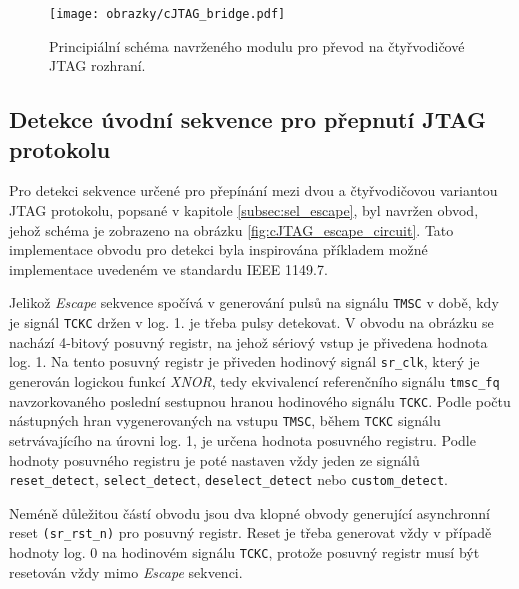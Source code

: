 \begin{figure}[!h]
  \begin{center}
    \texttt{[image: obrazky/cJTAG\_bridge.pdf]}
  \end{center}
  \caption{Principiální schéma navrženého modulu pro převod na čtyřvodičové \acs{JTAG} rozhraní.}
	\label{fig:cJTAG_bridge}
\end{figure}

\subsection{Detekce úvodní sekvence pro přepnutí \acs{JTAG} protokolu}	\label{subsec:sel_escape_det}
Pro detekci sekvence určené pro přepínání mezi dvou a čtyřvodičovou variantou \acs{JTAG} protokolu, popsané v kapitole \ref{subsec:sel_escape}, byl navržen obvod, jehož schéma je zobrazeno na obrázku \ref{fig:cJTAG_escape_circuit}. Tato implementace obvodu pro detekci byla inspirována příkladem možné implementace uvedeném ve standardu IEEE 1149.7.

Jelikož \textit{Escape} sekvence spočívá v generování pulsů na signálu \texttt{\acs{TMSC}} v době, kdy je signál \texttt{\acs{TCKC}} držen v log. 1. je třeba pulsy detekovat. V obvodu na obrázku se nachází 4-bitový posuvný registr, na jehož sériový vstup je přivedena hodnota log. 1. Na tento posuvný registr je přiveden hodinový signál \texttt{sr\_clk}, který je generován logickou funkcí \textit{XNOR}, tedy ekvivalencí referenčního signálu \texttt{tmsc\_fq} navzorkovaného poslední sestupnou hranou hodinového signálu \texttt{\acs{TCKC}}. Podle počtu nástupných hran vygenerovaných na vstupu {\texttt{\acs{TMSC}}}, během {\texttt{\acs{TCKC}}} signálu setrvávajícího na úrovni log. 1, je určena hodnota posuvného registru. Podle hodnoty posuvného registru je poté nastaven vždy jeden ze signálů \texttt{reset\_detect}, \texttt{select\_detect}, \texttt{deselect\_detect} nebo \texttt{custom\_detect}. %

Neméně důležitou částí obvodu jsou dva klopné obvody generující asynchronní reset \texttt{(sr\_rst\_n)} pro posuvný registr. Reset je třeba generovat vždy v případě hodnoty log. 0 na hodinovém signálu {\texttt{\acs{TCKC}}}, protože posuvný registr musí být resetován vždy mimo \textit{Escape} sekvenci. %

